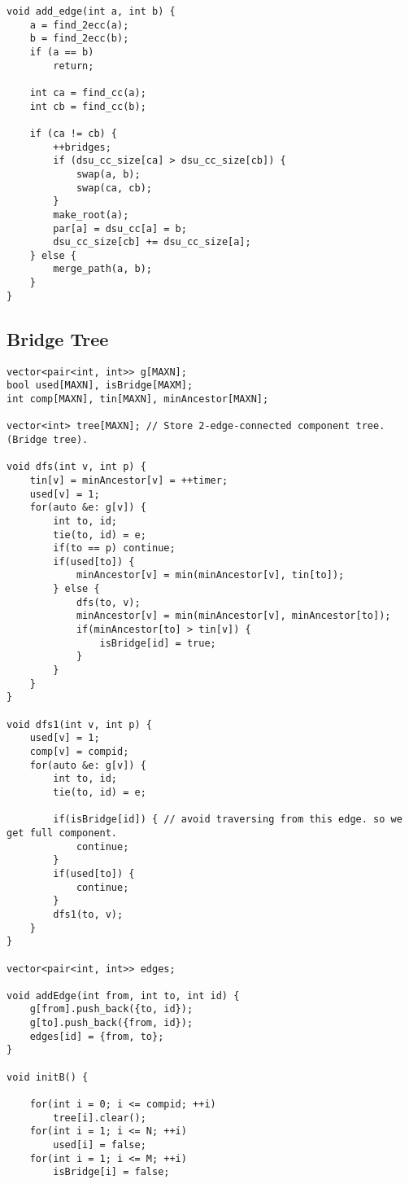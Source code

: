 \documentclass[10pt]{article}
\begin{document}
\begin{multicols*}{2}
\begin{lstlisting}[style=compactcpp]
void add_edge(int a, int b) {
    a = find_2ecc(a);
    b = find_2ecc(b);
    if (a == b)
        return;

    int ca = find_cc(a);
    int cb = find_cc(b);

    if (ca != cb) {
        ++bridges;
        if (dsu_cc_size[ca] > dsu_cc_size[cb]) {
            swap(a, b);
            swap(ca, cb);
        }
        make_root(a);
        par[a] = dsu_cc[a] = b;
        dsu_cc_size[cb] += dsu_cc_size[a];
    } else {
        merge_path(a, b);
    }
}
\end{lstlisting}

\subsection{Bridge Tree}

\begin{lstlisting}[style=compactcpp]
vector<pair<int, int>> g[MAXN];
bool used[MAXN], isBridge[MAXM];
int comp[MAXN], tin[MAXN], minAncestor[MAXN];

vector<int> tree[MAXN]; // Store 2-edge-connected component tree.(Bridge tree).

void dfs(int v, int p) {
    tin[v] = minAncestor[v] = ++timer;
    used[v] = 1;
    for(auto &e: g[v]) {
        int to, id;
        tie(to, id) = e;
        if(to == p) continue;
        if(used[to]) {
            minAncestor[v] = min(minAncestor[v], tin[to]);
        } else {
            dfs(to, v);
            minAncestor[v] = min(minAncestor[v], minAncestor[to]);
            if(minAncestor[to] > tin[v]) {
                isBridge[id] = true;
            }
        }
    }
}

void dfs1(int v, int p) {
    used[v] = 1;
    comp[v] = compid;
    for(auto &e: g[v]) {
        int to, id;
        tie(to, id) = e;
        
        if(isBridge[id]) { // avoid traversing from this edge. so we get full component.
            continue;
        }
        if(used[to]) {
            continue;
        }
        dfs1(to, v);
    }
}

vector<pair<int, int>> edges;

void addEdge(int from, int to, int id) {
    g[from].push_back({to, id});
    g[to].push_back({from, id});
    edges[id] = {from, to};
}

void initB() {

    for(int i = 0; i <= compid; ++i)
        tree[i].clear();
    for(int i = 1; i <= N; ++i)
        used[i] = false;
    for(int i = 1; i <= M; ++i)
        isBridge[i] = false;
    

\end{lstlisting}
\end{multicols*}
\end{document}
